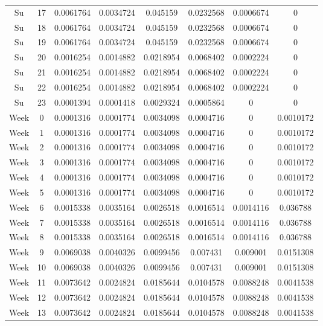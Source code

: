 \begin{center}
\begin{longtable}{cccccccc}
         Su & 17 & 0.0061764 & 0.0034724 & 0.045159 & 0.0232568 & 0.0006674 & 0 \\  
         Su & 18 & 0.0061764 & 0.0034724 & 0.045159 & 0.0232568 & 0.0006674 & 0 \\  
         Su & 19 & 0.0061764 & 0.0034724 & 0.045159 & 0.0232568 & 0.0006674 & 0 \\  
         Su & 20 & 0.0016254 & 0.0014882 & 0.0218954 & 0.0068402 & 0.0002224 & 0 \\  
         Su & 21 & 0.0016254 & 0.0014882 & 0.0218954 & 0.0068402 & 0.0002224 & 0 \\  
         Su & 22 & 0.0016254 & 0.0014882 & 0.0218954 & 0.0068402 & 0.0002224 & 0 \\  
         Su & 23 & 0.0001394 & 0.0001418 & 0.0029324 & 0.0005864 & 0 & 0 \\  
        Week & 0 & 0.0001316 & 0.0001774 & 0.0034098 & 0.0004716 & 0 & 0.0010172 \\  
        Week & 1 & 0.0001316 & 0.0001774 & 0.0034098 & 0.0004716 & 0 & 0.0010172 \\  
        Week & 2 & 0.0001316 & 0.0001774 & 0.0034098 & 0.0004716 & 0 & 0.0010172 \\  
        Week & 3 & 0.0001316 & 0.0001774 & 0.0034098 & 0.0004716 & 0 & 0.0010172 \\  
        Week & 4 & 0.0001316 & 0.0001774 & 0.0034098 & 0.0004716 & 0 & 0.0010172 \\  
        Week & 5 & 0.0001316 & 0.0001774 & 0.0034098 & 0.0004716 & 0 & 0.0010172 \\  
        Week & 6 & 0.0015338 & 0.0035164 & 0.0026518 & 0.0016514 & 0.0014116 & 0.036788 \\  
        Week & 7 & 0.0015338 & 0.0035164 & 0.0026518 & 0.0016514 & 0.0014116 & 0.036788 \\  
        Week & 8 & 0.0015338 & 0.0035164 & 0.0026518 & 0.0016514 & 0.0014116 & 0.036788 \\  
        Week & 9 & 0.0069038 & 0.0040326 & 0.0099456 & 0.007431 & 0.009001 & 0.0151308 \\  
        Week & 10 & 0.0069038 & 0.0040326 & 0.0099456 & 0.007431 & 0.009001 & 0.0151308 \\  
        Week & 11 & 0.0073642 & 0.0024824 & 0.0185644 & 0.0104578 & 0.0088248 & 0.0041538 \\  
        Week & 12 & 0.0073642 & 0.0024824 & 0.0185644 & 0.0104578 & 0.0088248 & 0.0041538 \\  
        Week & 13 & 0.0073642 & 0.0024824 & 0.0185644 & 0.0104578 & 0.0088248 & 0.0041538 \\  

\end{longtable}
\end{center}
